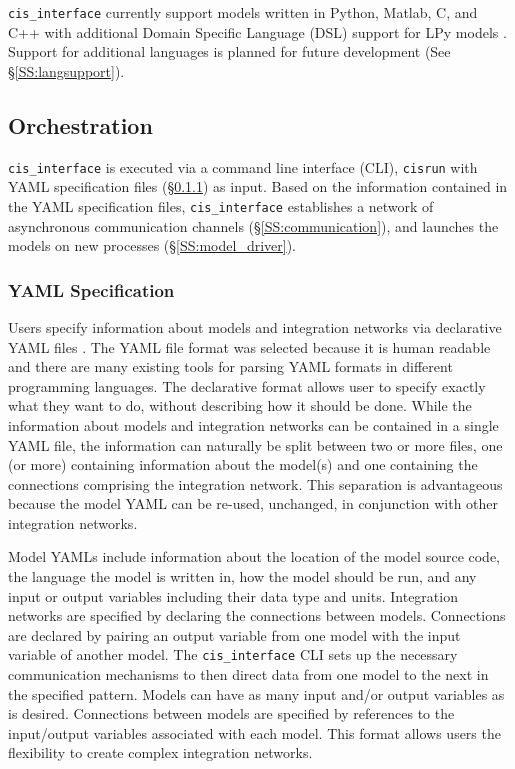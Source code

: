 \documentclass[journal]{IEEEtran}
\newcommand{\cis}{{\tt cis\_interface}{}}
\begin{document}
{\cis} currently support models written in Python, Matlab, C, and C++ with 
additional Domain Specific Language (DSL) support for LPy models \citep{Boudon2012}. Support for additional languages is planned for future development (See \S\ref{SS:langsupport}).

\subsection{Orchestration}\label{SS:orchestration}
%
{\cis} is executed via a command line interface (CLI), {\tt cisrun} with YAML specification files (\S\ref{SSS:yaml}) as input. Based on the information contained in the YAML specification files, {\cis} establishes a network of asynchronous communication channels (\S\ref{SS:communication}), and launches the models on new processes (\S\ref{SS:model_driver}).

\subsubsection{YAML Specification}\label{SSS:yaml}
%
Users specify information about models and integration networks via declarative 
YAML files \citep{Ben-Kiki2009}. The YAML file format was selected because it is human readable 
and there are many existing tools for parsing YAML formats in different programming 
languages. The declarative format allows user to specify exactly what they 
want to do, without describing how it should be done. While the information 
about models and integration networks can be contained in a single YAML 
file, the information can naturally be split between two or more files, one (or more) containing 
information about the model(s) and one containing the connections comprising the 
integration network. This separation is advantageous because the model YAML 
can be re-used, unchanged, in conjunction with other integration networks. 

Model YAMLs include information about the location of the 
model source code, the language the model is written in, how the model should 
be run, and any input or output variables including their data type and units. 
Integration networks are specified by declaring the connections 
between models. Connections are declared by pairing an output variable from 
one model with the input variable of another model. The {\cis} 
CLI sets up the necessary communication mechanisms to 
then direct data from one model to the next in the specified pattern. Models 
can have as many input and/or output variables as is desired.
Connections between models are specified by references to the 
input/output variables associated with each model. This format allows users the 
flexibility to create complex integration networks. 
\end{document}
